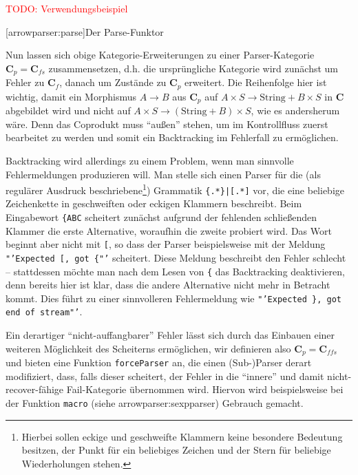\documentclass[11pt, a4paper, bibgerm]{scrbook}
\newcommand\icode[1]{\lstinline?#1?}
\newcommand{\todo}[1]{
  \textcolor{red}{TODO: #1}
}
\newcommand\lsection{}
\newcommand\sref{}
\newcommand\ato{\rightarrow} %
\newcommand{\sees}[1]{(siehe \sref{#1})}
\begin{document}
\todo{Verwendungsbeispiel}

\lsection[arrowparser:parse]{Der Parse-Funktor}

Nun lassen sich obige Kategorie-Erweiterungen zu einer Parser-Kategorie
$\mathbf{C}_p = \mathbf{C}_{fs}$ zusammensetzen, d.h. die ursprüngliche
Kategorie wird zunächst um Fehler zu $\mathbf{C}_f$, danach um Zustände
zu $\mathbf{C}_p$ erweitert. Die Reihenfolge hier ist wichtig, damit ein
Morphismus $A \ato B$ aus $\mathbf{C}_p$ auf $A \times S \ato
\mathrm{String} + B \times S$ in $\mathbf{C}$ abgebildet wird und nicht
auf $A \times S \ato (\mathrm{String} + B) \times S$, wie es andersherum
wäre. Denn das Coprodukt muss "`außen"' stehen, um im Kontrollfluss
zuerst bearbeitet zu werden und somit ein Backtracking im Fehlerfall zu
ermöglichen.

Backtracking wird allerdings zu einem Problem, wenn man sinnvolle
Fehlermeldungen produzieren will. Man stelle sich einen Parser für die
(als regulärer Ausdruck beschriebene\footnote{Hierbei sollen eckige und
  geschweifte Klammern keine besondere Bedeutung besitzen, der Punkt für
  ein beliebiges Zeichen und der Stern für beliebige Wiederholungen
  stehen.}) Grammatik \texttt{\{.*\}|[.*]} vor, die eine beliebige
Zeichenkette in geschweiften oder eckigen Klammern beschreibt. Beim
Eingabewort \texttt{\{ABC} scheitert zunächst aufgrund der fehlenden
schließenden Klammer die erste Alternative, woraufhin die zweite
probiert wird. Das Wort beginnt aber nicht mit \texttt{[}, so dass der
  Parser beispielsweise mit der Meldung \texttt{"'Expected [, got \{"'}
    scheitert. Diese Meldung beschreibt den Fehler schlecht --
    stattdessen möchte man nach dem Lesen von \texttt{\{} das
    Backtracking deaktivieren, denn bereits hier ist klar, dass die
    andere Alternative nicht mehr in Betracht kommt. Dies führt zu einer
    sinnvolleren Fehlermeldung wie \texttt{"'Expected \}, got end of
      stream"'}.

Ein derartiger "`nicht-auffangbarer"' Fehler lässt sich durch das
Einbauen einer weiteren Möglichkeit des Scheiterns ermöglichen, wir
definieren also $\mathbf{C}_p = \mathbf{C}_{ffs}$ und bieten eine
Funktion \icode{forceParser} an, die einen (Sub-)Parser derart
modifiziert, dass, falls dieser scheitert, der Fehler in die "`innere"'
und damit nicht-recover-fähige Fail-Kategorie übernommen wird. Hiervon
wird beispielsweise bei der Funktion \icode{macro}
\sees{arrowparser:sexpparser} Gebrauch gemacht.
\end{document}
